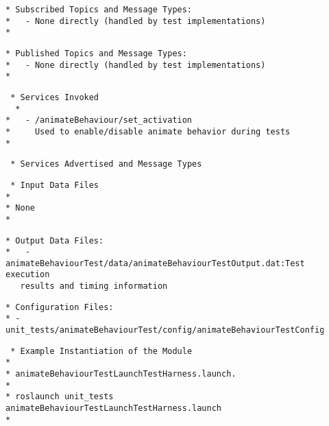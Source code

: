 \documentclass{CSSRforAfrica}
\newcommand{\checkboxChecked}{\fbox{\ding{51}}} %
\begin{document}
\begin{description}
\item[\checkboxChecked] 
 {\small 
\begin{verbatim}
* Subscribed Topics and Message Types:
*   - None directly (handled by test implementations)
* 
\end{verbatim}}

\item[\checkboxChecked] 
 {\small 
\begin{verbatim}                    
* Published Topics and Message Types:
*   - None directly (handled by test implementations)
* 
\end{verbatim}}

\item[\checkboxChecked] 
 {\small 
\begin{verbatim}                    
 * Services Invoked
  *
*   - /animateBehaviour/set_activation
*     Used to enable/disable animate behavior during tests
* 
\end{verbatim}}

\item[\checkboxChecked] 
 {\small 
\begin{verbatim}                    
 * Services Advertised and Message Types
\end{verbatim}}

\item[\checkboxChecked] 
 {\small 
\begin{verbatim}
 * Input Data Files
*
* None
*
\end{verbatim}}

\item[\checkboxChecked] 
 {\small 
\begin{verbatim}
* Output Data Files:
*   - animateBehaviourTest/data/animateBehaviourTestOutput.dat:Test execution 
   results and timing information
\end{verbatim}}

\item[\checkboxChecked] 
 {\small 
\begin{verbatim}
* Configuration Files:
* - unit_tests/animateBehaviourTest/config/animateBehaviourTestConfiguration.ini:
\end{verbatim}}

\item[\checkboxChecked] 
 {\small 
\begin{verbatim}
 * Example Instantiation of the Module
*
* animateBehaviourTestLaunchTestHarness.launch.
*
* roslaunch unit_tests animateBehaviourTestLaunchTestHarness.launch
*
\end{verbatim}}


\end{description}
\end{document}
